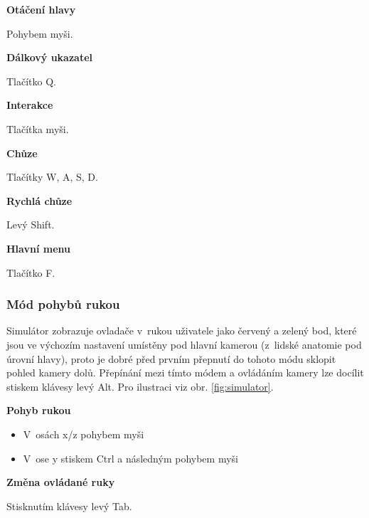 \documentclass[thesis=B,czech]{FITthesis}[2012/06/26]
\begin{document}
\begin{description}

	\item \textbf{Otáčení hlavy}
	
	Pohybem myši. 
	
	\item \textbf{Dálkový ukazatel}
	
	Tlačítko Q.		
	
	\item \textbf{Interakce}
	
	Tlačítka myši.
	
	
	\item \textbf{Chůze}
	
	Tlačítky W, A, S, D.	
	
	
	\item \textbf{Rychlá chůze}
	
	Levý Shift.
	
	\item \textbf{Hlavní menu}
	
	Tlačítko F.
	
\end{description}

\subsubsection{Mód pohybů rukou}
Simulátor zobrazuje ovladače v~rukou uživatele jako červený a zelený bod, které jsou ve výchozím nastavení umístěny pod hlavní kamerou (z~lidské anatomie pod úrovní hlavy), proto je dobré před prvním přepnutí do tohoto módu sklopit pohled kamery dolů. Přepínání mezi tímto módem a ovládáním kamery lze docílit stiskem klávesy levý Alt. Pro ilustraci viz obr. \ref{fig:simulator}.

\begin{description}

	\item \textbf{Pohyb rukou}
	
	\begin{itemize}
		\item V~osách x/z pohybem myši
		\item V~ose y stiskem Ctrl a následným pohybem myši
	\end{itemize}

	\item \textbf{Změna ovládané ruky}
	
	Stisknutím klávesy levý Tab.	

\end{description}
\end{document}
